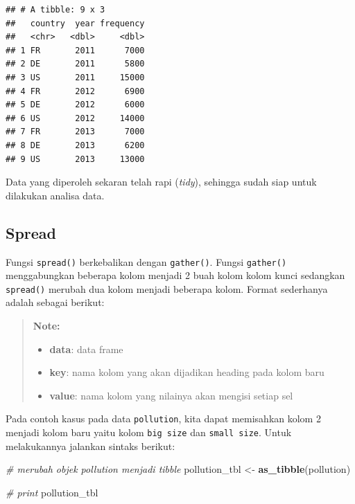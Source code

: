 \documentclass[]{book}
\newenvironment{Shaded}{\begin{snugshade}}{\end{snugshade}}
\newcommand{\KeywordTok}[1]{\textcolor[rgb]{0.13,0.29,0.53}{\textbf{#1}}}
\newcommand{\StringTok}[1]{\textcolor[rgb]{0.31,0.60,0.02}{#1}}
\newcommand{\CommentTok}[1]{\textcolor[rgb]{0.56,0.35,0.01}{\textit{#1}}}
\newcommand{\OperatorTok}[1]{\textcolor[rgb]{0.81,0.36,0.00}{\textbf{#1}}}
\newcommand{\NormalTok}[1]{#1}
\providecommand{\tightlist}{%
  \setlength{\itemsep}{0pt}\setlength{\parskip}{0pt}}
\begin{document}
\begin{Shaded}
\end{Shaded}

\begin{verbatim}
## # A tibble: 9 x 3
##   country  year frequency
##   <chr>   <dbl>     <dbl>
## 1 FR       2011      7000
## 2 DE       2011      5800
## 3 US       2011     15000
## 4 FR       2012      6900
## 5 DE       2012      6000
## 6 US       2012     14000
## 7 FR       2013      7000
## 8 DE       2013      6200
## 9 US       2013     13000
\end{verbatim}

Data yang diperoleh sekaran telah rapi (\emph{tidy}), sehingga sudah
siap untuk dilakukan analisa data.

\subsection{Spread}\label{spread}

Fungsi \texttt{spread()} berkebalikan dengan \texttt{gather()}. Fungsi
\texttt{gather()} menggabungkan beberapa kolom menjadi 2 buah kolom
kolom kunci sedangkan \texttt{spread()} merubah dua kolom menjadi
beberapa kolom. Format sederhanya adalah sebagai berikut:

\begin{quote}
\textbf{Note: }

\begin{itemize}
\tightlist
\item
  \textbf{data}: data frame
\item
  \textbf{key}: nama kolom yang akan dijadikan heading pada kolom baru
\item
  \textbf{value}: nama kolom yang nilainya akan mengisi setiap sel
\end{itemize}
\end{quote}

Pada contoh kasus pada data \texttt{pollution}, kita dapat memisahkan
kolom 2 menjadi kolom baru yaitu kolom \texttt{big\ size} dan
\texttt{small\ size}. Untuk melakukannya jalankan sintaks berikut:

\begin{Shaded}
\begin{Highlighting}[]
\CommentTok{# merubah objek pollution menjadi tibble}
\NormalTok{pollution_tbl <-}\StringTok{ }\KeywordTok{as_tibble}\NormalTok{(pollution)}

\CommentTok{# print}
\NormalTok{pollution_tbl}
\end{Highlighting}
\end{Shaded}
\end{document}
